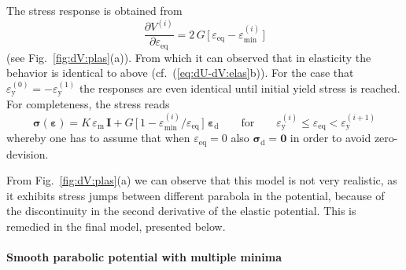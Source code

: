 \documentclass[times,namecite]{goose-article}
\begin{document}
The stress response is obtained from
\begin{equation}\label{eq:dV-plas}
  \frac{\partial V^{(i)}}{\partial \varepsilon_\mathrm{eq}}
  =
  2 \, G \, \Big[\, \varepsilon_\mathrm{eq} - \varepsilon_\mathrm{min}^{(i)} \,\Big]
\end{equation}
(see Fig.~\ref{fig:dV:plas}(a)). From which it can observed that in elasticity the behavior is identical to above (cf.~(\ref{eq:dU-dV:elas}b)). For the case that $\varepsilon_\mathrm{y}^{(0)} = - \varepsilon_\mathrm{y}^{(1)}$ the responses are even identical until initial yield stress is reached. For completeness, the stress reads
\begin{equation}
  \bm{\sigma} ( \bm{\varepsilon} )
  =
  K \, \varepsilon_\mathrm{m} \, \bm{I}
  +
  G \, \Big[\, 1 - \varepsilon_\mathrm{min}^{(i)} / \varepsilon_\mathrm{eq} \,\Big] \;
  \bm{\varepsilon}_\mathrm{d}
  \qquad
  \mathrm{for}
  \qquad
  \varepsilon_\mathrm{y}^{(i)} \leq \varepsilon_\mathrm{eq} < \varepsilon_\mathrm{y}^{(i+1)}
\end{equation}
whereby one has to assume that when $\varepsilon_\mathrm{eq} = 0$ also $\bm{\sigma}_\mathrm{d} = \bm{0}$ in order to avoid zero-devision.

From Fig.~\ref{fig:dV:plas}(a) we can observe that this model is not very realistic, as it exhibits stress jumps between different parabola in the potential, because of the discontinuity in the second derivative of the elastic potential. This is remedied in the final model, presented below.

\paragraph{Smooth parabolic potential with multiple minima}
\end{document}
